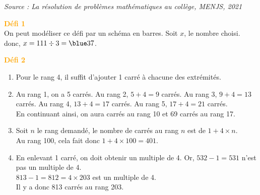 \begin{enigme}[Défis !!!]
   \vfill\hfill {\it\small Source : La résolution de problèmes mathématiques au collège, MENJS, 2021}
 \end{enigme}  
 
\begin{corrige}
\hspace*{-7.5mm} \textcolor{orange}{\bf Défi 1} \\
   On peut modéliser ce défi par un schéma en barres. Soit $x$, le nombre choisi. \\
    donc, $x =111\div3 ={\blue 37}$.

\hspace*{-7.5mm} \textcolor{orange}{\bf Défi 2} \\
   \begin{enumerate}
      \item Pour le rang 4, il suffit {\blue d'ajouter 1 carré à chacune des extrémités}.
      \item Au rang 1, on a 5 carrés. Au rang 2, $5+4 =9$ carrés. Au rang 3, $9+4 =13$ carrés.  Au rang 4, $13+4 =17$ carrés. {\blue Au rang 5, $17+4 =21$ carrés}. \\
         En continuant ainsi, on aura { carrés au rang 10 et 69 carrés au rang 17}.
         \item Soit $n$ le rang demandé, {\blue le nombre de carrés au rang $n$ est de $1+4\times n$}. \\
            Au rang 100, cela fait donc $1+4\times100 =401$.
         \item En enlevant 1 carré, on doit obtenir un multiple de 4. Or, $532-1 =531$ n'est pas un multiple de 4. \\
            $813-1 =812 =4\times203$ est un multiple de 4. \\
            {\blue Il y a donc 813 carrés au rang 203}.     
   \end{enumerate}
\end{corrige}


